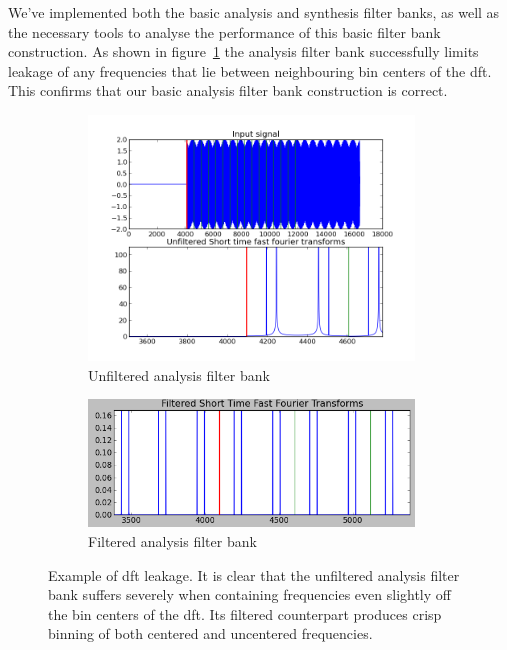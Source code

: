 \documentclass[a4paper,10pt]{article}
\begin{document}
We've implemented both the basic analysis and synthesis filter banks, as well as the necessary tools to analyse the performance of this basic filter bank construction. As shown in 
figure~\ref{filtered_and_unfiltered_analysis} the analysis filter bank successfully limits leakage of any frequencies that lie between neighbouring bin centers of the \gls{dft}.
This confirms that our basic analysis filter bank construction is correct.
\begin{figure}[h]
 \begin{subfigure}{0.5\textwidth}
  \includegraphics[width=0.95\textwidth]{unfiltered.png}
  \caption{Unfiltered analysis filter bank}
 \end{subfigure}
 \begin{subfigure}{0.5\textwidth}
  \includegraphics[width=0.95\textwidth]{filtered.png}
  \caption{Filtered analysis filter bank}
 \end{subfigure}
\caption{Example of \gls{dft} leakage. It is clear that the unfiltered analysis filter bank suffers severely when containing frequencies even slightly off the bin centers
	 of the \gls{dft}. Its filtered counterpart produces crisp binning of both centered and uncentered frequencies.}
\label{filtered_and_unfiltered_analysis}
\end{figure}
\end{document}
